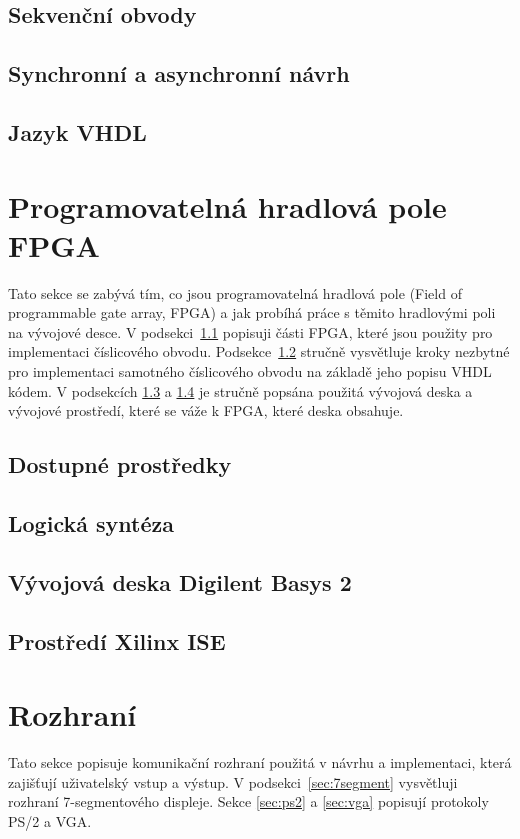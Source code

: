 \documentclass{report}
\begin{document}
\subsection{Sekvenční obvody}\label{sec:sekvencniobvody}
\subsection{Synchronní a asynchronní návrh}\label{sec:synchronniaasynchronninavrh}
\subsection{Jazyk VHDL}\label{sec:jazykvhdl}

\section{Programovatelná hradlová pole FPGA}\label{sec:fpga}
Tato sekce se zabývá tím, co jsou programovatelná hradlová pole (Field of programmable gate array, FPGA) a jak probíhá práce s těmito hradlovými poli na vývojové desce. V podsekci~\ref{sec:dostupneprostredky} popisuji části FPGA, které jsou použity pro implementaci číslicového obvodu. Podsekce~\ref{sec:logickasynteza} stručně vysvětluje kroky nezbytné pro implementaci samotného číslicového obvodu na základě jeho popisu VHDL kódem. V podsekcích \ref{sec:basys2} a \ref{sec:xilinxise} je stručně popsána použitá vývojová deska a vývojové prostředí, které se váže k FPGA, které deska obsahuje.

\subsection{Dostupné prostředky}\label{sec:dostupneprostredky}
\subsection{Logická syntéza}\label{sec:logickasynteza}
\subsection{Vývojová deska Digilent Basys 2}\label{sec:basys2}
\subsection{Prostředí Xilinx ISE}\label{sec:xilinxise}

\section{Rozhraní}\label{sec:rozhrani}
Tato sekce popisuje komunikační rozhraní použitá v návrhu a implementaci, která zajišťují uživatelský vstup a výstup. V podsekci~\ref{sec:7segment} vysvětluji rozhraní 7-segmentového displeje. Sekce  \ref{sec:ps2} a \ref{sec:vga} popisují protokoly PS/2 a VGA.
\end{document}
